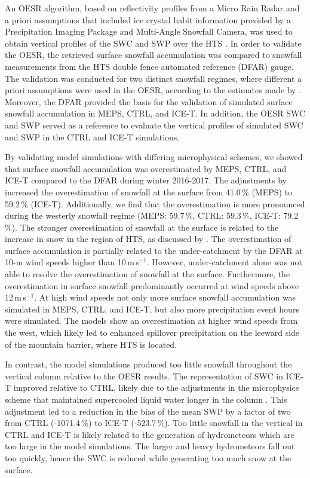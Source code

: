 \documentclass{ametsocV5}
\begin{document}
    An OESR algorithm, based on reflectivity profiles from a Micro Rain Radar and a priori assumptions that included ice crystal habit information provided by a Precipitation Imaging Package and Multi-Angle Snowfall Camera, was used to obtain vertical profiles of the SWC and SWP over the HTS \citep{schirle_estimation_2019}. In order to validate the OESR, the retrieved surface snowfall accumulation was compared to snowfall measurements from the HTS double fence automated reference (DFAR) gauge. The validation was conducted for two distinct snowfall regimes, where different a priori assumptions were used in the OESR, according to the estimates made by \citet{schirle_estimation_2019}. Moreover, the DFAR provided the basis for the validation of simulated surface snowfall accumulation in MEPS, CTRL, and ICE-T. In addition, the OESR SWC and SWP served as a reference to evaluate the vertical profiles of simulated SWC and SWP in the CTRL and ICE-T simulations.
    
    By validating model simulations with differing microphysical schemes, we showed that surface snowfall accumulation was overestimated by MEPS, CTRL, and ICE-T compared to the DFAR during winter 2016-2017. The adjustments by \citet{engdahl_effects_2020} increased the overestimation of snowfall at the surface from 41.0\,\% (MEPS) to 59.2\,\% (ICE-T). Additionally, we find that the overestimation is more pronounced during the westerly snowfall regime (MEPS: 59.7\,\%, CTRL: 59.3\,\%, ICE-T: 79.2\,\%). The stronger overestimation of snowfall at the surface is related to the increase in snow in the region of HTS, as discussed by \citet{engdahl_effects_2020}. The overestimation of surface accumulation is partially related to the under-catchment by the DFAR at 10-m wind speeds higher than 10\,m\,s$^{-1}$.
    However, under-catchment alone was not able to resolve the overestimation of snowfall at the surface. Furthermore, the  overestimation in surface snowfall predominantly occurred at wind speeds above 12\,m\,s$^{-1}$. At high wind speeds not only more surface snowfall accumulation was simulated in MEPS, CTRL, and ICE-T, but also more precipitation event hours were simulated. The models show an overestimation at higher wind speeds from the west, which likely led to enhanced spillover precipitation on the leeward side of the mountain barrier, where HTS is located.
    
    In contrast, the model simulations produced too little snowfall throughout the vertical column relative to the OESR results. The representation of SWC in ICE-T improved relative to CTRL, likely due to the adjustments in the microphysics scheme that maintained supercooled liquid water longer in the column \citep{engdahl_effects_2020}. This adjustment led to a reduction in the bias of the mean SWP by a factor of two from CTRL (-1071.4\,\%) to ICE-T (-523.7\,\%). Too little snowfall in the vertical in CTRL and ICE-T is likely related to the generation of hydrometeors which are too large in the model simulations. The larger and heavy hydrometeors fall out too quickly, hence the SWC is reduced while generating too much snow at the surface.
    
\end{document}
